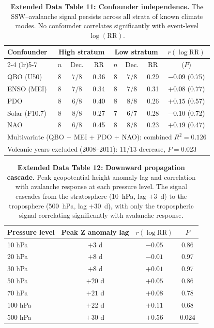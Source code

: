 \documentclass[11pt,letterpaper]{article}
\begin{document}
\begin{table}[!ht]
\centering
\caption{\textbf{Extended Data Table 11: Confounder independence.}
The SSW--avalanche signal persists across all strata of known climate modes. No confounder correlates significantly with event-level $\log(\mathrm{RR})$.}
\label{tab:confounders}
\small
\begin{tabular}{lccccccc}
\toprule
Confounder & \multicolumn{3}{c}{High stratum} & \multicolumn{3}{c}{Low stratum} & $r(\log\mathrm{RR})$ \\
\cmidrule(lr){2-4} \cmidrule(lr){5-7}
 & $n$ & Dec. & RR & $n$ & Dec. & RR & ($P$) \\
\midrule
QBO (U50) & 8 & 7/8 & 0.36 & 8 & 7/8 & 0.29 & $-0.09$ (0.75) \\
ENSO (MEI) & 8 & 7/8 & 0.34 & 8 & 7/8 & 0.31 & $+0.08$ (0.77) \\
PDO & 8 & 6/8 & 0.40 & 8 & 8/8 & 0.26 & $+0.15$ (0.57) \\
Solar (F10.7) & 8 & 8/8 & 0.27 & 7 & 6/7 & 0.28 & $-0.10$ (0.72) \\
NAO & 8 & 6/8 & 0.45 & 8 & 8/8 & 0.23 & $+0.19$ (0.47) \\
\midrule
\multicolumn{8}{l}{Multivariate (QBO + MEI + PDO + NAO): combined $R^2 = 0.126$} \\
\multicolumn{8}{l}{Volcanic years excluded (2008--2011): 11/13 decrease, $P = 0.023$} \\
\bottomrule
\end{tabular}
\end{table}

\begin{table}[!ht]
\centering
\caption{\textbf{Extended Data Table 12: Downward propagation cascade.}
Peak geopotential height anomaly lag and correlation with avalanche response at each pressure level. The signal cascades from the stratosphere (10~hPa, lag $+3$~d) to the troposphere (500~hPa, lag $+30$~d), with only the tropospheric signal correlating significantly with avalanche response.}
\label{tab:propagation}
\small
\begin{tabular}{lccc}
\toprule
Pressure level & Peak Z anomaly lag & $r(\log\mathrm{RR})$ & $P$ \\
\midrule
10 hPa & $+3$ d & $-0.05$ & 0.86 \\
20 hPa & $+8$ d & $-0.01$ & 0.97 \\
30 hPa & $+8$ d & $+0.01$ & 0.97 \\
50 hPa & $+20$ d & $+0.05$ & 0.86 \\
70 hPa & $+21$ d & $+0.08$ & 0.78 \\
100 hPa & $+22$ d & $+0.11$ & 0.68 \\
500 hPa & $+30$ d & $+0.56$ & 0.024 \\
\bottomrule
\end{tabular}
\end{table}
\end{document}
